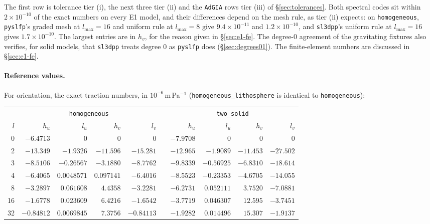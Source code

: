\documentclass[11pt]{article}
\numberwithin{equation}{section}
\newcommand{\code}[1]{\texttt{#1}}
\begin{document}
The first row is tolerance tier (i), the next three tier (ii) and the
\code{AdGIA} rows tier (iii) of \S\ref{sec:tolerances}. Both spectral codes
sit within $2\times10^{-10}$ of the exact numbers on every E1 model, and
their differences depend on the mesh rule, as tier (ii) expects: on
\code{homogeneous}, \code{pyslfp}'s graded mesh at $l_{\max}=16$ and uniform
rule at $l_{\max}=8$ give $9.4\times10^{-11}$ and $1.2\times10^{-10}$, and
\code{sl3dpp}'s uniform rule at $l_{\max}=16$ gives $1.7\times10^{-10}$. The
largest entries are in $h_v$, for the reason given in
\S\ref{sec:e1-fe}. The degree-0 agreement of the
gravitating fixtures also verifies, for solid models, that \code{sl3dpp}
treats degree 0 as \code{pyslfp} does (\S\ref{sec:degrees01}). The
finite-element numbers are discussed in \S\ref{sec:e1-fe}.

\paragraph{Reference values.} For orientation, the exact traction numbers,
in $10^{-6}$\,m\,Pa$^{-1}$ (\code{homogeneous\_lithosphere} is identical to
\code{homogeneous}):
\begin{center}
\small
\begin{tabular}{@{}r rrrr c rrrr@{}}
\toprule
& \multicolumn{4}{c}{\code{homogeneous}} && \multicolumn{4}{c}{\code{two\_solid}} \\
\cmidrule{2-5}\cmidrule{7-10}
$l$ & $h_u$ & $l_u$ & $h_v$ & $l_v$ && $h_u$ & $l_u$ & $h_v$ & $l_v$ \\
\midrule
0 & $-6.4713$ & 0 & 0 & 0 && $-7.9708$ & 0 & 0 & 0 \\
2 & $-13.349$ & $-1.9326$ & $-11.596$ & $-15.281$ && $-12.965$ & $-1.9089$ & $-11.453$ & $-27.502$ \\
3 & $-8.5106$ & $-0.26567$ & $-3.1880$ & $-8.7762$ && $-9.8339$ & $-0.56925$ & $-6.8310$ & $-18.614$ \\
4 & $-6.4065$ & $0.0048571$ & $0.097141$ & $-6.4016$ && $-8.5523$ & $-0.23353$ & $-4.6705$ & $-14.055$ \\
8 & $-3.2897$ & $0.061608$ & $4.4358$ & $-3.2281$ && $-6.2731$ & $0.052111$ & $3.7520$ & $-7.0881$ \\
16 & $-1.6778$ & $0.023609$ & $6.4216$ & $-1.6542$ && $-3.7719$ & $0.046307$ & $12.595$ & $-3.7451$ \\
32 & $-0.84812$ & $0.0069845$ & $7.3756$ & $-0.84113$ && $-1.9282$ & $0.014496$ & $15.307$ & $-1.9137$ \\
\bottomrule
\end{tabular}
\end{center}
\end{document}
